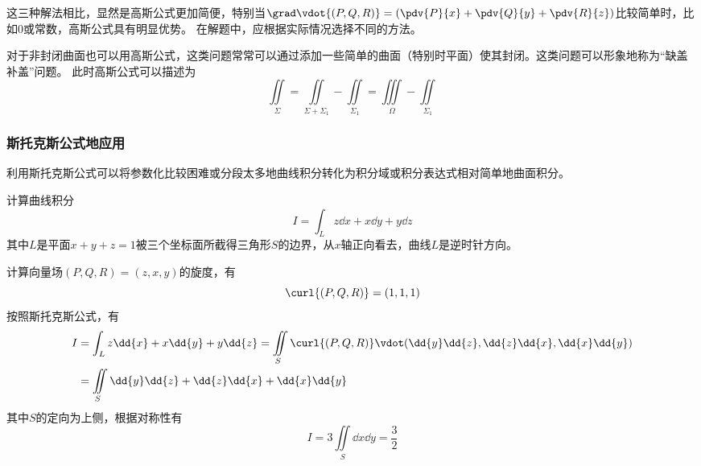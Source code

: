 这三种解法相比，显然是高斯公式更加简便，特别当$\grad\vdot{(P,Q,R)} = \left(\pdv{P}{x}+\pdv{Q}{y}+\pdv{R}{z}\right)$比较简单时，比如$0$或常数，高斯公式具有明显优势。
在解题中，应根据实际情况选择不同的方法。

对于非封闭曲面也可以用高斯公式，这类问题常常可以通过添加一些简单的曲面（特别时平面）使其封闭。这类问题可以形象地称为“缺盖补盖”问题。
此时高斯公式可以描述为
\[ \iint\limits_\Sigma = \iint\limits_{\Sigma+\Sigma_1} - \iint\limits_{\Sigma_1} = \iiint\limits_\Omega - \iint\limits_{\Sigma_1} \]

\subsubsection{斯托克斯公式地应用}
利用斯托克斯公式可以将参数化比较困难或分段太多地曲线积分转化为积分域或积分表达式相对简单地曲面积分。

\begin{example}
    计算曲线积分
    \[ I = \int_L z\dd{x} + x\dd{y} + y\dd{z} \]
    其中$L$是平面$x+y+z=1$被三个坐标面所截得三角形$S$的边界，从$x$轴正向看去，曲线$L$是逆时针方向。
\end{example}
\begin{solution}
    计算向量场$(P,Q,R)=(z,x,y)$的旋度，有
    \[ \curl{(P,Q,R)} = (1,1,1) \]
    按照斯托克斯公式，有
    \begin{align*}
        I & = \int_L z\dd{x} + x\dd{y} + y\dd{z}
        = \iint\limits_S \curl{(P,Q,R)}\vdot(\dd{y}\dd{z},\dd{z}\dd{x},\dd{x}\dd{y}) \\
          & = \iint\limits_S \dd{y}\dd{z} + \dd{z}\dd{x} + \dd{x}\dd{y}              \\
    \end{align*}
    其中$S$的定向为上侧，根据对称性有
    \[ I = 3\iint\limits_S \dd{x}\dd{y} = \frac{3}{2} \]
\end{solution}

